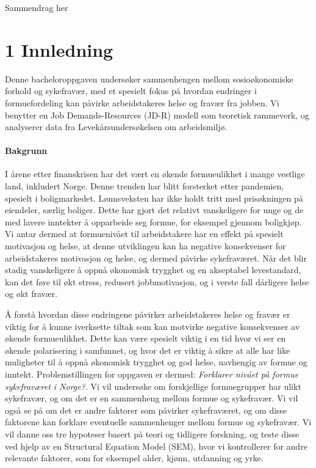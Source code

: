 \documentclass[
  12pt,
  a4paper,
  DIV=11,
  numbers=noendperiod]{scrartcl}
\let\oldparagraph\paragraph
\renewcommand{\paragraph}[1]{\oldparagraph{#1}\mbox{}}
\begin{document}
Sammendrag her



\newpage

\section{1 Innledning}\label{innledning}

Denne bacheloroppgaven undersøker sammenhengen mellom sosioøkonomiske
forhold og sykefravær, med et spesielt fokus på hvordan endringer i
formuefordeling kan påvirke arbeidstakeres helse og fravær fra jobben.
Vi benytter en Job Demands-Resources (JD-R) modell som teoretisk
rammeverk, og analyserer data fra Levekårsundersøkelsen om arbeidsmiljø.

\paragraph{Bakgrunn}\label{bakgrunn}

I årene etter finanskrisen har det vært en økende formueulikhet i mange
vestlige land, inkludert Norge. Denne trenden har blitt forsterket etter
pandemien, spesielt i boligmarkedet. Lønnsveksten har ikke holdt tritt
med prisøkningen på eiendeler, særlig boliger. Dette har gjort det
relativt vanskeligere for unge og de med lavere inntekter å opparbeide
seg formue, for eksempel gjennom boligkjøp. Vi antar dermed at
formuenivået til arbeidstakere har en effekt på spesielt motivasjon og
helse, at denne utviklingen kan ha negative konsekvenser for
arbeidstakeres motivasjon og helse, og dermed påvirke sykefraværet. Når
det blir stadig vanskeligere å oppnå økonomisk trygghet og en akseptabel
levestandard, kan det føre til økt stress, redusert jobbmotivasjon, og i
verste fall dårligere helse og økt fravær.

Å forstå hvordan disse endringene påvirker arbeidstakeres helse og
fravær er viktig for å kunne iverksette tiltak som kan motvirke negative
konsekvenser av økende formueulikhet. Dette kan være spesielt viktig i
en tid hvor vi ser en økende polarisering i samfunnet, og hvor det er
viktig å sikre at alle har like muligheter til å oppnå økonomisk
trygghet og god helse, uavhengig av formue og inntekt. Problemstillingen
for oppgaven er dermed: \emph{Forklarer nivået på formue sykefraværet i
Norge?}. Vi vil undersøke om forskjellige formuegrupper har ulikt
sykefravær, og om det er en sammenheng mellom formue og sykefravær. Vi
vil også se på om det er andre faktorer som påvirker sykefraværet, og om
disse faktorene kan forklare eventuelle sammenhenger mellom formue og
sykefravær. Vi vil danne oss tre hypoteser basert på teori og tidligere
forskning, og teste disse ved hjelp av en Structural Equation Model
(SEM), hvor vi kontrollerer for andre relevante faktorer, som for
eksempel alder, kjønn, utdanning og yrke.
\end{document}
